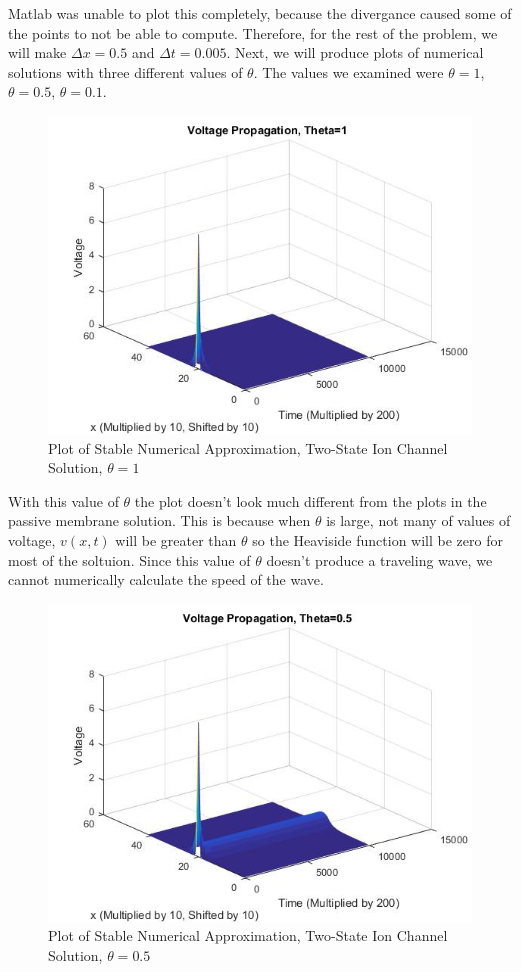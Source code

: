 \documentclass[12pt]{article}
\begin{document}
Matlab was unable to plot this completely, because the divergance caused some of the points to not be able to compute. Therefore, for the rest of the problem, we will make $\Delta{x}=0.5$ and $\Delta{t}=0.005$. Next, we will produce plots of numerical solutions with three different values of $\theta$. The values we examined were $\theta=1$, $\theta=0.5$, $\theta=0.1$. 
\begin{figure}[H]
  \includegraphics[width=\linewidth]{thetaone.jpg}
  \caption{Plot of Stable Numerical Approximation, Two-State Ion Channel Solution, $\theta=1$}
  \label{fig:sketch4}
\end{figure}
With this value of $\theta$ the plot doesn't look much different from the plots in the passive membrane solution. This is because when $\theta$ is large, not many of values of voltage, $v(x,t)$ will be greater than $\theta$ so the Heaviside function will be zero for most of the soltuion. Since this value of $\theta$ doesn't produce a traveling wave, we cannot numerically calculate the speed of the wave. 
\begin{figure}[H]
  \includegraphics[width=\linewidth]{thetatwo.jpg}
  \caption{Plot of Stable Numerical Approximation, Two-State Ion Channel Solution, $\theta=0.5$}
  \label{fig:sketch5}
\end{figure}
\end{document}
